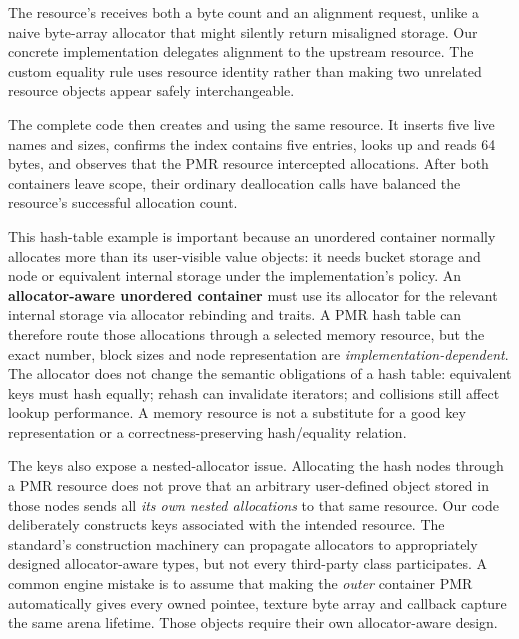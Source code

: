 The resource's  receives both a byte count and an alignment request, unlike a naive byte-array allocator that might silently return misaligned storage. Our concrete implementation delegates alignment to the upstream resource. The custom equality rule uses resource identity rather than making two unrelated resource objects appear safely interchangeable.

The complete code then creates  and  using the same resource. It inserts five live names and sizes, confirms the index contains five entries, looks up  and reads 64 bytes, and observes that the PMR resource intercepted allocations. After both containers leave scope, their ordinary deallocation calls have balanced the resource's successful allocation count.

This hash-table example is important because an unordered container normally allocates more than its user-visible value objects: it needs bucket storage and node or equivalent internal storage under the implementation's policy. An \textbf{allocator-aware unordered container} must use its allocator for the relevant internal storage via allocator rebinding and traits. A PMR hash table can therefore route those allocations through a selected memory resource, but the exact number, block sizes and node representation are \emph{implementation-dependent}. The allocator does not change the semantic obligations of a hash table: equivalent keys must hash equally; rehash can invalidate iterators; and collisions still affect lookup performance. A memory resource is not a substitute for a good key representation or a correctness-preserving hash/equality relation.

The  keys also expose a nested-allocator issue. Allocating the hash nodes through a PMR resource does not prove that an arbitrary user-defined object stored in those nodes sends all \emph{its own nested allocations} to that same resource. Our code deliberately constructs keys associated with the intended resource. The standard's  construction machinery can propagate allocators to appropriately designed allocator-aware types, but not every third-party class participates. A common engine mistake is to assume that making the \emph{outer} container PMR automatically gives every owned pointee, texture byte array and callback capture the same arena lifetime. Those objects require their own allocator-aware design.

